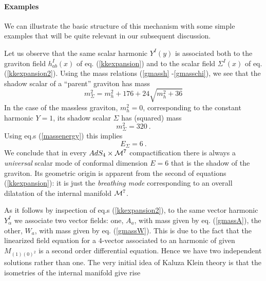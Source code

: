 \documentclass[a4paper,11pt]{article}
\begin{document}
\paragraph{Examples}
We can illustrate the basic structure of this mechanism with some
simple examples that will be quite relevant in our subsequent
discussion.
\par
Let us observe that the same scalar harmonic $Y^I(y)$ is
associated both to the graviton field $h^I_{ab}(x)$ of eq.
(\ref{kkexpansion}) and to the scalar field $\Sigma^I(x)$ of eq.
(\ref{kkexpansion2}). Using the mass relations (\ref{gmassh}
-\ref{gmasschi}), we see that the shadow scalar of a ``parent''
graviton has mass
\begin{equation}
  m_\Sigma^2 =m_h^2 +176 +24 \sqrt{m_h^2+36}
\label{shasca}
\end{equation}
In the case of the massless graviton, $m_h^2=0$, corresponding to
the constant harmonic $Y=1$, its shadow scalar $\Sigma$ has
(squared) mass
\begin{equation}
  m^2_\Sigma = 320~.
\label{massigma}
\end{equation}
Using eq.s (\ref{massenergy}) this implies
\begin{equation}
  E_\Sigma = 6~.
\label{Esigma}
\end{equation}
We conclude that in every $AdS_4 \times {\cal M}^7$
compactification there is always a \emph{universal} scalar mode of
conformal dimension $E=6$ that is the shadow of the graviton. Its
geometric origin is apparent from the second of equations
(\ref{kkexpansion}): it is just the \emph{breathing mode}
corresponding to an overall dilatation of the internal manifold
${\cal M}^7$.
\par
As it follows by inspection of eq.s (\ref{kkexpansion2}), to the
same vector harmonic $Y^I_\alpha $ we associate two vector fields:
one, $A_a$, with mass given by eq. (\ref{gmassA}), the other,
$W_a$, with mass given by eq. (\ref{gmassW}). This is due to the
fact that the linearized field equation for a $4$-vector
associated to an harmonic of given $M_{(1)(0)^2}$ is a second
order differential equation. Hence we have two independent
solutions rather than one. The very initial idea of Kaluza Klein
theory is that the isometries of the internal manifold give rise
\end{document}
